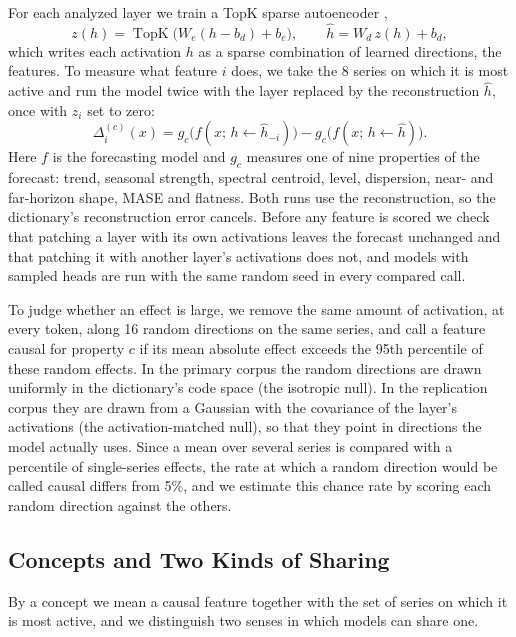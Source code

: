 \documentclass[twoside,11pt]{article}
\begin{document}
For each analyzed layer we train a TopK sparse autoencoder \citep{gao2025topk},
\begin{equation}
z(h)=\operatorname{TopK}\big(W_e(h-b_d)+b_e\big), \qquad \hat h=W_d\,z(h)+b_d ,
\end{equation}
which writes each activation $h$ as a sparse combination of learned directions, the features.
To measure what feature $i$ does, we take the 8 series on which it is most active and run the model twice with the layer replaced by the reconstruction $\hat h$, once with $z_i$ set to zero:
\begin{equation}
\Delta_i^{(c)}(x) = g_c\big(f(x;\,h\leftarrow\hat h_{-i})\big) - g_c\big(f(x;\,h\leftarrow\hat h)\big).
\label{eq:ablation}
\end{equation}
Here $f$ is the forecasting model and $g_c$ measures one of nine properties of the forecast: trend, seasonal strength, spectral centroid, level, dispersion, near- and far-horizon shape, MASE and flatness.
Both runs use the reconstruction, so the dictionary's reconstruction error cancels.
Before any feature is scored we check that patching a layer with its own activations leaves the forecast unchanged and that patching it with another layer's activations does not, and models with sampled heads are run with the same random seed in every compared call.

To judge whether an effect is large, we remove the same amount of activation, at every token, along 16 random directions on the same series, and call a feature causal for property $c$ if its mean absolute effect exceeds the 95th percentile of these random effects.
In the primary corpus the random directions are drawn uniformly in the dictionary's code space (the isotropic null).
In the replication corpus they are drawn from a Gaussian with the covariance of the layer's activations (the activation-matched null), so that they point in directions the model actually uses.
Since a mean over several series is compared with a percentile of single-series effects, the rate at which a random direction would be called causal differs from 5\%, and we estimate this chance rate by scoring each random direction against the others.

\subsection{Concepts and Two Kinds of Sharing}
\label{sec:sharing}

By a concept we mean a causal feature together with the set of series on which it is most active, and we distinguish two senses in which models can share one.
\end{document}
